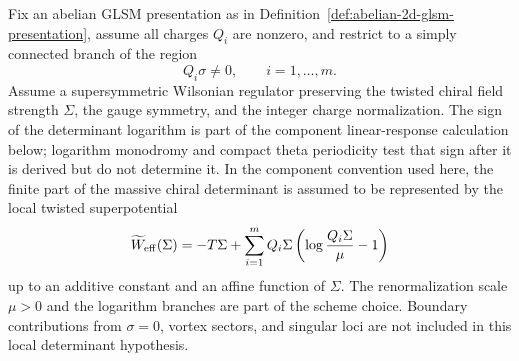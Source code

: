 \begin{hypothesis}
\label{hyp:abelian-glsm-coulomb-one-loop-determinant}
Fix an abelian GLSM presentation as in
Definition~\ref{def:abelian-2d-glsm-presentation}, assume all charges \(Q_i\) are
nonzero, and restrict to a simply connected branch of the region
\[
  Q_i\sigma\neq0,\qquad i=1,\ldots,m.
\]
Assume a supersymmetric Wilsonian regulator preserving the twisted chiral
field strength \(\Sigma\), the gauge symmetry, and the integer charge
normalization.  The sign of the determinant logarithm is part of the component
linear-response calculation below; logarithm monodromy and compact theta
periodicity test that sign after it is derived but do not determine it.  In
the component convention used here, the finite part of the massive chiral
determinant is assumed to be represented by the local twisted superpotential
\begin{equation}
  \widetilde W_{\rm eff}(\Sigma)
  =
  -T\Sigma
  +
  \sum_{i=1}^m
  Q_i\Sigma\left(
    \log\frac{Q_i\Sigma}{\mu}-1
  \right)
  \label{eq:abelian-glsm-one-loop-twisted-superpotential}
\end{equation}
up to an additive constant and an affine function of \(\Sigma\).  The
renormalization scale \(\mu>0\) and the logarithm branches are part of the
scheme choice.  Boundary contributions from \(\sigma=0\), vortex sectors,
and singular loci are not included in this local determinant hypothesis.
\end{hypothesis}

